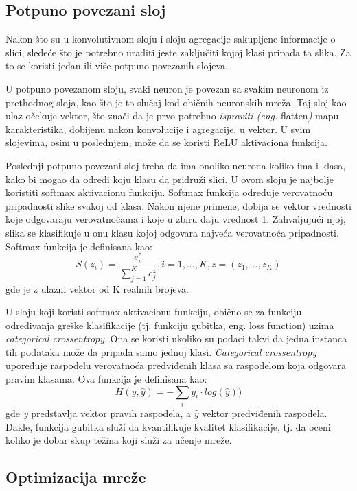 \documentclass[a4paper]{article}
\begin{document}
\subsection{Potpuno povezani sloj}
\label{potpuno_povezani_sloj}

Nakon što su u konvolutivnom sloju i sloju agregacije sakupljene informacije o slici, sledeće što je potrebno uraditi jeste zaključiti kojoj klasi pripada ta slika. Za to se koristi jedan ili više potpuno povezanih slojeva. 

U potpuno povezanom sloju, svaki neuron je povezan sa svakim neuronom iz prethodnog sloja, kao što je to slučaj kod običnih neuronskih mreža. Taj sloj kao ulaz očekuje vektor, što znači da je prvo potrebno \textit{ispraviti (eng.} flatten\textit{)} mapu karakteristika, dobijenu nakon konvolucije i agregacije, u vektor. U svim slojevima, osim u poslednjem, može da se koristi ReLU aktivaciona funkcija.

Poslednji potpuno povezani sloj treba da ima onoliko neurona koliko ima i klasa, kako bi mogao da odredi koju klasu da pridruži slici. U ovom sloju je najbolje koristiti softmax aktivacionu funkciju. Softmax funkcija određuje verovatnoću pripadnosti slike svakoj od klasa. Nakon njene primene, dobija se vektor vrednosti koje odgovaraju verovatnoćama i koje u zbiru daju vrednost 1. Zahvaljujući njoj, slika se klasifikuje u onu klasu kojoj odgovara najveća verovatnoća pripadnosti. Softmax funkcija je definisana kao: $$ S(z_i) = \frac{e^z_i}{\sum_{j=1}^{K}e^z_j},  i = 1,...,K,  z = (z_1,...,z_K) $$ gde je z ulazni vektor od K realnih brojeva. 

U sloju koji koristi softmax aktivacionu funkciju, obično se za funkciju određivanja greške klasifikacije (tj. funkciju gubitka, eng. loss function) uzima \textit{categorical crossentropy}. Ona se koristi ukoliko su podaci takvi da jedna instanca tih podataka može da pripada samo jednoj klasi. \textit{Categorical crossentropy} upoređuje raspodelu verovatnoća predviđenih klasa sa raspodelom koja odgovara pravim klasama. Ova funkcija je definisana kao:
$$ H(y, \hat{y}) = -\sum_{i} y_i\cdot log(\hat{y})) $$ gde \textit{y} predstavlja vektor pravih raspodela, a $\hat{y}$ vektor predviđenih raspodela. Dakle, funkcija gubitka služi da kvantifikuje kvalitet klasifikacije, tj. da oceni koliko je dobar skup težina koji služi za učenje mreže.

\subsection{Optimizacija mreže}
\label{optimizacija}
\end{document}
